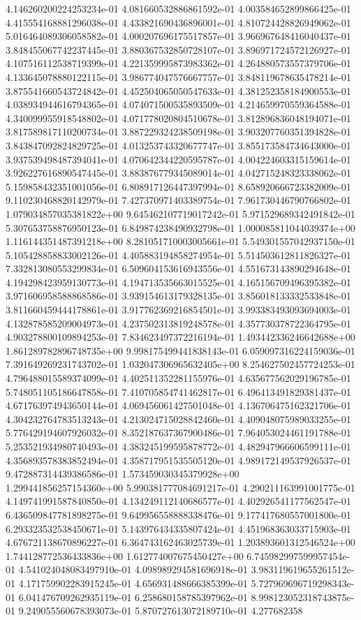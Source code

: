 4.146260200224253234e-01	4.081660532886861592e-01	4.003584652899866425e-01	4.415554168881296038e-01	4.433821690436896001e-01	4.810724428826949062e-01	5.016464089306058582e-01	4.000207696175517857e-01	3.966967648416040437e-01	3.848455067742237445e-01	3.880367532850728107e-01	3.896971724572126927e-01	4.107516112538719399e-01	4.221359995873983362e-01	4.264880573557379706e-01	4.133645078880122115e-01	3.986774047576667757e-01	3.848119678635478214e-01	3.875541660543724842e-01	4.452504065050547633e-01	4.381252358184900553e-01	4.038934944616794365e-01	4.074071500535893509e-01	4.214659970559364588e-01	4.340099955918548802e-01	4.071778020804510678e-01	3.812896836048194071e-01	3.817589817110200734e-01	3.887229324238509198e-01	3.903207760351394828e-01	3.843847092824829725e-01	4.013253743320677747e-01	3.855173584734643000e-01	3.937539498487394041e-01	4.070642344220595787e-01	4.004224603315159614e-01	3.926227616890547445e-01	3.883876779345089014e-01	4.042715248323338062e-01	5.159858432351001056e-01	6.808917126447397994e-01	8.658920666723382009e-01	9.110230468820142979e-01	7.427370971403389754e-01	7.961730446790766802e-01	1.079034857035381822e+00	9.645462107719017242e-01	5.971529689342491842e-01	5.307653758876950123e-01	6.849874238490932798e-01	1.000085811044039374e+00	1.116144351487391218e+00	8.281051710003005661e-01	5.549301557042937150e-01	5.105428858833002126e-01	4.405883194858274954e-01	5.514503612811826327e-01	7.332813080553299834e-01	6.509604153616943556e-01	4.551673143890294648e-01	4.194298423959130773e-01	4.194713535663015525e-01	4.165156709496395382e-01	3.971606958588868586e-01	3.939154613179328135e-01	3.856018133332533848e-01	3.811660459444178861e-01	3.917762369216854501e-01	3.993383493093694003e-01	4.132878585209004973e-01	4.237502313819248578e-01	4.357730378722364795e-01	4.903278800109894253e-01	7.834623497372216194e-01	1.493442336246642688e+00	1.861289782896748735e+00	9.998175499441838143e-01	6.059097316224159036e-01	7.391649269231743702e-01	1.032047306965632405e+00	8.254627502457724253e-01	4.796488015589374099e-01	4.402511352281155976e-01	4.635677562029196785e-01	5.748051105186647858e-01	7.410705854741462817e-01	6.496413491829381437e-01	4.671763974943650144e-01	4.069456061427501048e-01	4.136706475162321706e-01	4.304232764783513243e-01	4.213024715028842460e-01	4.409048075989033255e-01	5.776429194607926032e-01	8.352187637367900486e-01	7.964053024461191788e-01	5.253521934980740493e-01	4.383245199595878772e-01	4.482947966606599111e-01	4.356893578383852494e-01	4.358717951535505120e-01	4.989172149537926537e-01	9.472887314439386586e-01	1.573459030345379928e+00	1.299441856257154360e+00	5.990381777084691217e-01	4.290211163991001775e-01	4.149741991587840850e-01	4.134249112140686577e-01	4.402926541177562547e-01	6.436509847781898275e-01	9.649956558888338476e-01	9.177417680557001800e-01	6.293323532538450671e-01	5.143976434335807424e-01	4.451968363033715903e-01	4.676721138670896227e-01	6.364743162463025739e-01	1.203893601312546524e+00	1.744128772536433836e+00	1.612774007675450427e+00	6.745982997599957454e-01	4.541024048083497910e-01	4.098989294581696918e-01	3.983119619655261512e-01	4.171759902283915245e-01	4.656931488666385399e-01	5.727969696719298343e-01	6.041476709262935119e-01	6.258680158785397962e-01	8.998123052318743875e-01	9.249055560678393073e-01	5.870727613072189710e-01	4.277682358